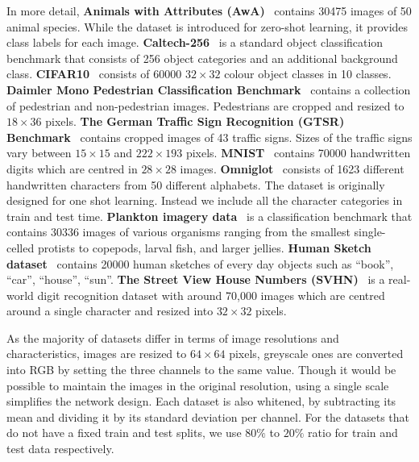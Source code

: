 \documentclass[10pt,twocolumn,letterpaper]{article}
\begin{document}
In more detail, \textbf{Animals with Attributes (AwA)}~\cite{lampert2009learning} contains 30475 images of 50 animal species. While the dataset is introduced for zero-shot learning, it provides class labels for each image. \textbf{Caltech-256}~\cite{griffin2007caltech} is a standard object classification benchmark that consists of 256 object categories and an additional background class. \textbf{CIFAR10}~\cite{krizhevsky2009learning} consists of 60000 $32\times32$ colour object classes in 10 classes. \textbf{Daimler Mono Pedestrian Classification Benchmark}~\cite{munder2006experimental} contains a collection of pedestrian and non-pedestrian images. Pedestrians are cropped and resized to $18\times36$ pixels. \textbf{The German Traffic Sign Recognition (GTSR) Benchmark}~\cite{Stallkamp2012} contains cropped images of 43 traffic signs. Sizes of the traffic signs vary between $15\times15$ and $222\times193$ pixels. \textbf{MNIST}~\cite{lecun1998mnist} contains 70000 handwritten digits which are centred in $28\times28$ images. \textbf{Omniglot}~\cite{lake2015human} consists of 1623 different handwritten characters from 50 different alphabets. The dataset is originally designed for one shot learning. Instead we include all the character categories in train and test time. \textbf{Plankton imagery data}~\cite{planktonv1} is a classification benchmark that contains 30336 images of various organisms ranging from the smallest single-celled protists to copepods, larval fish, and larger jellies. \textbf{Human Sketch dataset}~\cite{eitz2012hdhso} contains 20000 human sketches of every day objects such as ``book'', ``car'', ``house'', ``sun''. \textbf{The Street View House Numbers (SVHN)}~\cite{netzer2011reading} is a real-world digit recognition dataset with around 70,000 images which are centred around a single character and resized into $32\times32$ pixels.

As the majority of datasets differ in terms of image resolutions and characteristics, images are resized to $64\times64$ pixels, greyscale ones are converted into RGB by setting the three channels to the same value. Though it would be possible to maintain the images in the original resolution, using a single scale simplifies the network design. Each dataset is also whitened, by subtracting its mean and dividing it by its standard deviation per channel. For the datasets that do not have a fixed train and test splits, we use $80\%$ to $20\%$ ratio for train and test data respectively.
\end{document}
